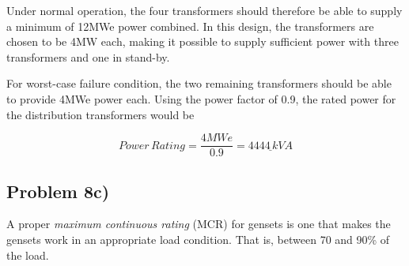 Under normal operation, the four transformers should therefore be able to supply a minimum of 12MWe power combined. In this design, the transformers are chosen to be 4MW each, making it possible to supply sufficient power with three transformers and one in stand-by. 

For worst-case failure condition, the two remaining transformers should be able to provide 4MWe power each. Using the power factor of 0.9, the rated power for the distribution transformers would be 

\[
Power\, Rating=\frac{4MWe}{0.9}=\underline{4444\,kVA}
\]








\subsection{Problem 8c)}
A proper \textit{maximum continuous rating} (MCR) for gensets is one that makes the gensets work in an appropriate load condition. That is, between 70 and 90\% of the load.  

